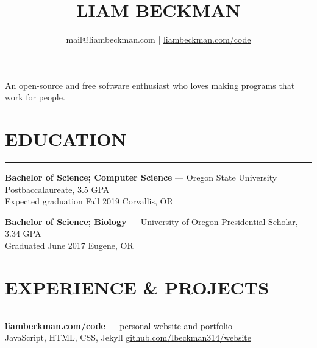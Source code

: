 


\title{\textcolor{my-red}{LIAM BECKMAN}}
\author{mail@liambeckman.com | \href{https://liambeckman.com/code}{liambeckman.com/code}}

\date{\vspace{-5ex}}



\maketitle

\begin{center}
An open-source and free software enthusiast who loves making programs that work for people.
\end{center}

\newcommand{\myTitle}[1] {
    \vspace{-0.5em}
    \section*{\large{#1}}\vspace{-1.7em}
    \textcolor{my-grey}{\rule{\linewidth}{0.5pt}}
    \vspace{-1em}
}

\newcommand{\showoff}[4] {
    \textcolor{my-blue}{\textbf{#1}} --- #2\\
    \textcolor{my-grey}{#3 \hfill #4}
    \medskip
}

\newcommand{\myBreak} {
    \textcolor{my-grey}{\dotfill}
    \smallskip
}

\myTitle{EDUCATION}


\showoff{Bachelor of Science; Computer Science}{Oregon State University Postbaccalaureate, 3.5 GPA}{Expected graduation Fall 2019}{Corvallis, OR}

\myBreak

\showoff{Bachelor of Science; Biology}{University of Oregon Presidential Scholar, 3.34 GPA}{Graduated June 2017}{Eugene, OR}

\medbreak

\myTitle{EXPERIENCE \& PROJECTS}

\showoff{\href{https://liambeckman.com}{liambeckman.com/code}}{personal website and portfolio}{JavaScript, HTML, CSS, Jekyll}{\href{https://github.com/lbeckman314/website}{github.com/lbeckman314/website}}


